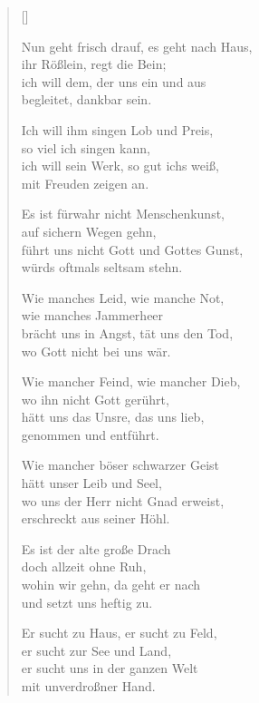 \begin{multicols}{2}
\settowidth{\versewidth}{Nun geht frisch drauf, es geht nach Haus,}
\begin{verse}[\versewidth]

 Nun geht frisch drauf, es geht nach Haus,\\
ihr Rößlein, regt die Bein;\\
ich will dem, der uns ein und aus\\
begleitet, dankbar sein.

 Ich will ihm singen Lob und Preis,\\
so viel ich singen kann,\\
ich will sein Werk, so gut ichs weiß,\\
mit Freuden zeigen an.

 Es ist fürwahr nicht Menschenkunst,\\
auf sichern Wegen gehn,\\
führt uns nicht Gott und Gottes Gunst,\\
würds oftmals seltsam stehn.

 Wie manches Leid, wie manche Not,\\
wie manches Jammerheer\\
brächt uns in Angst, tät uns den Tod,\\
wo Gott nicht bei uns wär.

 Wie mancher Feind, wie mancher Dieb,\\
wo ihn nicht Gott gerührt,\\
hätt uns das Unsre, das uns lieb,\\
genommen und entführt.

 Wie mancher böser schwarzer Geist\\
hätt unser Leib und Seel,\\
wo uns der Herr nicht Gnad erweist,\\
erschreckt aus seiner Höhl.

 Es ist der alte große Drach\\
doch allzeit ohne Ruh,\\
wohin wir gehn, da geht er nach\\
und setzt uns heftig zu.

 Er sucht zu Haus, er sucht zu Feld,\\
er sucht zur See und Land,\\
er sucht uns in der ganzen Welt\\
mit unverdroßner Hand.


\end{verse}
\end{multicols}
